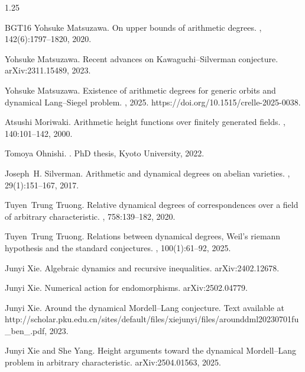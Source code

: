 \documentclass[12pt]{amsart}
\begin{document}
\begin{spacing}{1.25}
\begin{thebibliography}{BGT16}
Yohsuke Matsuzawa.
\newblock On upper bounds of arithmetic degrees.
, 142(6):1797--1820, 2020.

Yohsuke Matsuzawa.
\newblock Recent advances on {K}awaguchi--{S}ilverman conjecture.
\newblock arXiv:2311.15489, 2023.

Yohsuke Matsuzawa.
\newblock Existence of arithmetic degrees for generic orbits and dynamical
  {L}ang--{S}iegel problem.
, 2025.
\newblock https://doi.org/10.1515/crelle-2025-0038.

Atsushi Moriwaki.
\newblock Arithmetic height functions over finitely generated fields.
, 140:101--142, 2000.

Tomoya Ohnishi.
.
\newblock PhD thesis, Kyoto University, 2022.

Joseph~H. Silverman.
\newblock Arithmetic and dynamical degrees on abelian varieties.
, 29(1):151--167, 2017.

Tuyen~Trung Truong.
\newblock Relative dynamical degrees of correspondences over a field of
  arbitrary characteristic.
, 758:139--182, 2020.

Tuyen~Trung Truong.
\newblock Relations between dynamical degrees, {W}eil's riemann hypothesis and
  the standard conjectures.
, 100(1):61--92, 2025.

Junyi Xie.
\newblock Algebraic dynamics and recursive inequalities.
\newblock arXiv:2402.12678.

Junyi Xie.
\newblock Numerical action for endomorphisms.
\newblock arXiv:2502.04779.

Junyi Xie.
\newblock Around the dynamical {M}ordell--{L}ang conjecture.
\newblock Text available at
  http://scholar.pku.edu.cn/sites/default/files/xiejunyi/files/arounddml20230701fu\_ben\_.pdf,
  2023.

Junyi Xie and She Yang.
\newblock Height arguments toward the dynamical {M}ordell--{L}ang problem in
  arbitrary characteristic.
\newblock arXiv:2504.01563, 2025.

\end{thebibliography}

\end{spacing}
\end{document}
